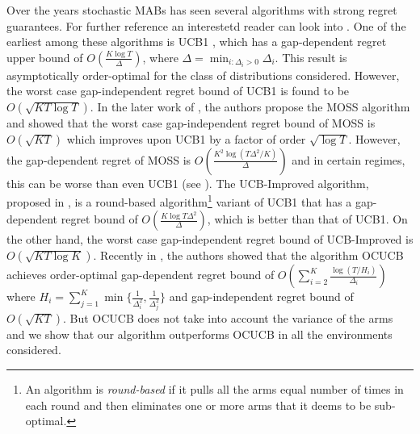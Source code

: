 
	Over the years stochastic MABs has seen several algorithms with strong regret guarantees. For  further reference an interestetd reader can look into \citet{bubeck2012bandits}. One of the earliest among these algorithms is UCB1 \cite{auer2002finite}, which has a gap-dependent regret upper bound of  $O\left(\frac{K\log T}{\Delta}\right)$, where $\Delta = \min_{i:\Delta_i>0} \Delta_i$. This result is asymptotically order-optimal for the class of distributions considered. However, the worst case gap-independent regret bound of UCB1 is found to be  $O \left(\sqrt{KT\log T}\right)$. In the later work of \citet{audibert2009minimax}, the authors propose the MOSS algorithm and showed that the worst case gap-independent regret bound of MOSS is $O\left( \sqrt{KT} \right)$ which improves upon UCB1 by a factor of order $\sqrt{\log T}$. However, the gap-dependent regret of MOSS is  $O\left( \frac{K^{2}\log\left(T\Delta^{2}/K\right)}{\Delta}\right)$ and in certain regimes, this can be worse than even UCB1 (see \citet{audibert2009minimax,lattimore2015optimally}). The UCB-Improved algorithm, proposed in \citet{auer2010ucb}, is a round-based algorithm\footnote{An algorithm is \textit{round-based} if it pulls all the arms equal number of times in each round and then eliminates one or more arms that it deems  to be sub-optimal.} variant of UCB1 that 
has a gap-dependent regret bound of $O\left(\frac{K\log T\Delta^{2}}{\Delta}\right)$, which is better than that of UCB1. On the other hand, the worst case gap-independent regret bound of UCB-Improved is $O\left(\sqrt{KT\log K}\right)$. Recently in \citet{lattimore2015optimally}, the authors showed that  the algorithm OCUCB achieves order-optimal gap-dependent regret bound of $O\left(\sum_{i=2}^{K}\frac{\log\left(T/H_i\right)}{\Delta_i}\right)$ where $H_i=\sum_{j=1}^{K}\min\lbrace \frac{1}{\Delta_i^2},\frac{1}{\Delta_j^2}\rbrace$ and gap-independent regret bound of $O\left( \sqrt{KT}\right)$. But OCUCB does not take into account the variance of the arms and we show that our algorithm outperforms OCUCB in all the environments considered. 

